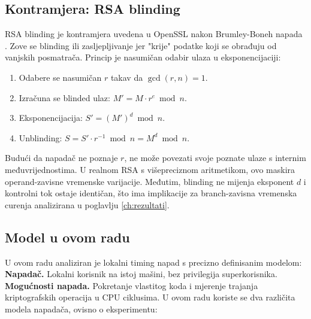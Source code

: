 \subsection{Kontramjera: RSA blinding}
\label{sec:blinding_theory}

RSA blinding je kontramjera uvedena u OpenSSL nakon Brumley-Boneh napada \cite{brumley2003}.  Zove se blinding ili zasljepljivanje jer "krije" podatke koji se obrađuju od vanjskih posmatrača. Princip je nasumičan odabir ulaza u eksponencijaciji:

\begin{enumerate}
\item Odabere se nasumičan $r$ takav da $\gcd(r, n) = 1$.
\item Izračuna se blinded ulaz: $M' = M \cdot r^e \bmod n$.
\item Eksponencijacija: $S' = (M')^d \bmod n$.
\item Unblinding: $S = S' \cdot r^{-1} \bmod n = M^d \bmod n$.
\end{enumerate}

Budući da napadač ne poznaje $r$, ne može povezati svoje poznate ulaze s internim međuvrijednostima. U realnom RSA s višepreciznom aritmetikom, ovo maskira operand-zavisne vremenske varijacije. Međutim, blinding ne mijenja eksponent $d$ i kontrolni tok ostaje identičan, što ima implikacije za branch-zavisna vremenska curenja analizirana u poglavlju \ref{ch:rezultati}.

\subsection{Model u ovom radu}

U ovom radu analiziran je lokalni timing napad s precizno definisanim modelom:
\\

\textbf{Napadač.}
Lokalni korisnik na istoj mašini, bez privilegija superkorisnika.
\\

\textbf{Mogućnosti napada.}
Pokretanje vlastitog koda i mjerenje trajanja kriptografskih operacija u CPU ciklusima. U ovom radu koriste se dva različita modela napadača, ovisno o eksperimentu:

